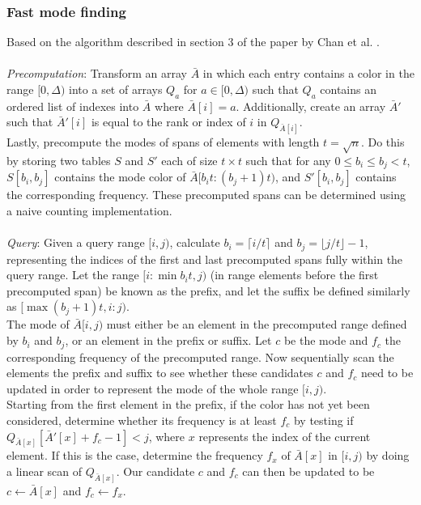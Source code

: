 \documentclass{article}
\begin{document}
\subsubsection{Fast mode finding}
Based on the algorithm described in section 3 of the paper by Chan et al.
\cite{Chan2014}. \\\\ \textit{Precomputation}: Transform an array $\bar{A}$ in
which each entry contains a color in the range $[0, \Delta)$ into a set of
arrays $Q_a$ for $a \in [0, \Delta)$ such that $Q_a$ contains an ordered list
of indexes into $\bar{A}$ where $\bar{A}[i] = a$. Additionally, create an array
$\bar{A}'$ such that $\bar{A}'[i]$ is equal to the rank or index of $i$ in
$Q_{\bar{A}[i]}$. \\ Lastly, precompute the modes of spans of elements with
length $t = \sqrt{n}$. Do this by storing two tables $S$ and $S'$ each of size
$t \times t$ such that for any $0\leq b_i \leq b_j < t$, $S[b_i, b_j]$ contains
the mode color of $\bar{A}[b_it : (b_j + 1)t)$, and $S'[b_i, b_j]$ contains the
corresponding frequency. These precomputed spans can be determined using a
naive counting implementation. \\\\ \textit{Query}: Given a query range $[i,
    j)$, calculate $b_i=\lceil i/t \rceil$ and $b_j=\lfloor j/t \rfloor - 1$,
representing the indices of the first and last precomputed spans fully within
the query range. Let the range $[i : \min{b_it, j})$ (in range elements before
the first precomputed span) be known as the prefix, and let the suffix be
defined similarly as $[\max{(b_j + 1)t, i} : j)$. \\ The mode of $\bar{A}[i,
    j)$ must either be an element in the precomputed range defined by $b_i$ and
$b_j$, or an element in the prefix or suffix. Let $c$ be the mode and $f_c$ the
corresponding frequency of the precomputed range. Now sequentially scan the
elements the prefix and suffix to see whether these candidates $c$ and $f_c$
need to be updated in order to represent the mode of the whole range $[i, j)$.
\\ Starting from the first element in the prefix, if the color has not yet been
considered, determine whether its frequency is at least $f_c$ by testing if
$Q_{\bar{A}[x]}[\bar{A}'[x] + f_c - 1] < j$, where $x$ represents the index of
the current element. If this is the case, determine the frequency $f_x$ of
$\bar{A}[x]$ in $[i, j)$ by doing a linear scan of $Q_{\bar{A}[x]}$. Our
candidate $c$ and $f_c$ can then be updated to be $c \leftarrow \bar{A}[x]$ and
$f_c \leftarrow f_x$.
\end{document}

